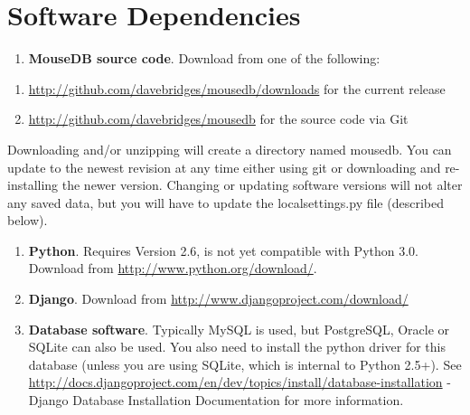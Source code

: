 \documentclass[letterpaper,10pt,english]{sphinxmanual}
\begin{document}
\section{Software Dependencies}
\begin{enumerate}
\item {} 
\textbf{MouseDB source code}.  Download from one of the following:

\end{enumerate}
\begin{enumerate}
\item {} 
\href{http://github.com/davebridges/mousedb/downloads}{http://github.com/davebridges/mousedb/downloads} for the current release

\item {} 
\href{http://github.com/davebridges/mousedb}{http://github.com/davebridges/mousedb} for the source code via Git

\end{enumerate}

Downloading and/or unzipping will create a directory named mousedb.  You can update to the newest revision at any time either using git or downloading and re-installing the newer version.  Changing or updating software versions will not alter any saved data, but you will have to update the localsettings.py file (described below).
\begin{enumerate}
\item {} 
\textbf{Python}.  Requires Version 2.6, is not yet compatible with Python 3.0.  Download from \href{http://www.python.org/download/}{http://www.python.org/download/}.

\item {} 
\textbf{Django}.  Download from \href{http://www.djangoproject.com/download/}{http://www.djangoproject.com/download/}

\item {} 
\textbf{Database software}.  Typically MySQL is used, but PostgreSQL, Oracle or SQLite can also be used.  You also need to install the python driver for this database (unless you are using SQLite, which is internal to Python 2.5+).  See \href{http://docs.djangoproject.com/en/dev/topics/install/database-installation}{http://docs.djangoproject.com/en/dev/topics/install/database-installation} - Django Database Installation Documentation for more information.

\end{enumerate}
\end{document}
